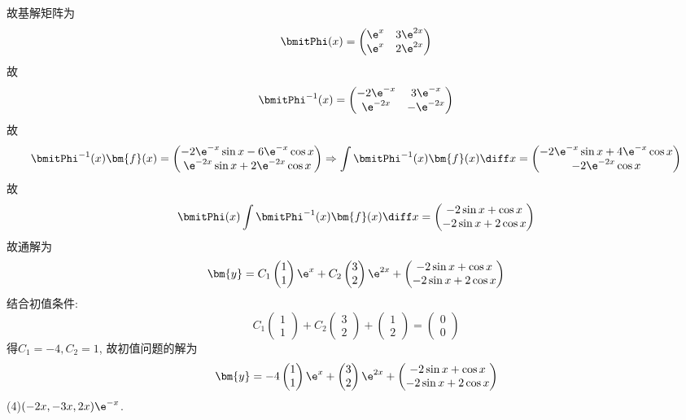 \begin{solve}
故基解矩阵为
\[\bmitPhi(x)=\begin{pmatrix}\e^x&3\e^{2x}\\\e^x&2\e^{2x}\end{pmatrix}\]
故\[\bmitPhi^{-1}(x)=\begin{pmatrix}-2\e^{-x}&3\e^{-x}\\\e^{-2x}&-\e^{-2x}\end{pmatrix}\]
故\[\bmitPhi^{-1}(x)\bm{f}(x)=\begin{pmatrix}-2\e^{-x}\sin x-6\e^{-x}\cos x\\\e^{-2x}\sin x+2\e^{-2x}\cos x\end{pmatrix}\Rightarrow\int\bmitPhi^{-1}(x)\bm{f}(x)\diff x=\begin{pmatrix}-2\e^{-x}\sin x+4\e^{-x}\cos x\\-2\e^{-2x}\cos x\end{pmatrix}\]
故\[\bmitPhi(x)\int\bmitPhi^{-1}(x)\bm{f}(x)\diff x=\begin{pmatrix}-2\sin x+\cos x\\-2\sin x+2\cos x\end{pmatrix}\]
故通解为
\[\bm{y}=C_1\begin{pmatrix}1\\1\end{pmatrix}\e^x+C_2\begin{pmatrix}3\\2\end{pmatrix}\e^{2x}+\begin{pmatrix}-2\sin x+\cos x\\-2\sin x+2\cos x\end{pmatrix}\]
结合初值条件:
\[C_1\begin{pmatrix}1\\1\end{pmatrix}+C_2\begin{pmatrix}3\\2\end{pmatrix}+\begin{pmatrix}1\\2\end{pmatrix}=\begin{pmatrix}0\\0\end{pmatrix}\]
得$C_1=-4,C_2=1$, 故初值问题的解为
\[\bm{y}=-4\begin{pmatrix}1\\1\end{pmatrix}\e^x+\begin{pmatrix}3\\2\end{pmatrix}\e^{2x}+\begin{pmatrix}-2\sin x+\cos x\\-2\sin x+2\cos x\end{pmatrix}\]
(4)$(-2x,-3x,2x)\e^{-x}$.
\end{solve}


